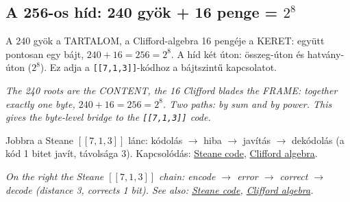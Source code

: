 \documentclass[11pt,a4paper]{article}
\newcommand{\nyelvPar}[2]{\noindent\begin{minipage}[t]{0.48\textwidth}{\small #1}\end{minipage}\hfill\begin{minipage}[t]{0.48\textwidth}{\small\itshape #2}\end{minipage}\par\vspace{2mm}}
\begin{document}
\subsection{A 256-os híd: 240 gyök + 16 penge = $2^8$}\label{kartya:híd}
\nyelvPar{A 240 gyök a TARTALOM, a Clifford-algebra 16 pengéje a KERET: együtt pontosan egy bájt, $240+16=256=2^8$. A híd két úton: összeg-úton és hatvány-úton ($2^8$). Ez adja a \texttt{[[7,1,3]]}-kódhoz a bájtszintű kapcsolatot.}{\textit{The 240 roots are the CONTENT, the 16 Clifford blades the FRAME: together exactly one byte, $240+16=256=2^8$. Two paths: by sum and by power. This gives the byte-level bridge to the \texttt{[[7,1,3]]} code.}}
\begin{center}
\qquad
{}
\end{center}
\nyelvPar{Jobbra a Steane $[[7,1,3]]$ lánc: kódolás $\to$ hiba $\to$ javítás $\to$ dekódolás (a kód 1 bitet javít, távolsága 3). Kapcsolódás: \href{https://en.wikipedia.org/wiki/Steane_code}{Steane code}, \href{https://en.wikipedia.org/wiki/Clifford_algebra}{Clifford algebra}.}{\textit{On the right the Steane $[[7,1,3]]$ chain: encode $\to$ error $\to$ correct $\to$ decode (distance 3, corrects 1 bit). See also: \href{https://en.wikipedia.org/wiki/Steane_code}{Steane code}, \href{https://en.wikipedia.org/wiki/Clifford_algebra}{Clifford algebra}.}}
\end{document}
